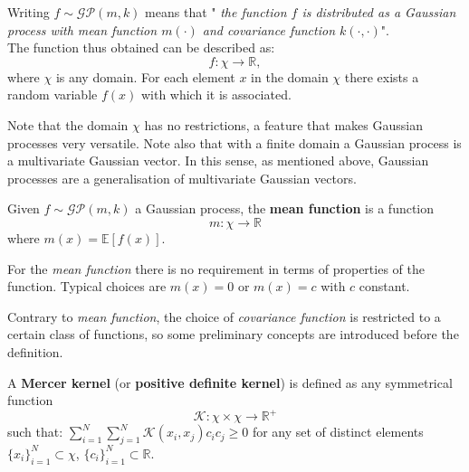 \begin{nota}
  Writing $f\sim \mathcal{GP}(m,k)$ means that "\textit{ the function $f$ is distributed as a Gaussian process with mean function $m(\cdot)$ and covariance function $k(\cdot,\cdot)$}".\\
  The function thus obtained can be described as:
\[f: \chi \rightarrow \mathbb{R},\]
where $\chi$ is any domain. For each element $x$ in the domain $\chi$ there exists a random variable $f(x)$ with which it is associated.
\end{nota}



\begin{oss} \label{oss1}
  Note that the domain $\chi$ has no restrictions, a feature that makes Gaussian processes very versatile. Note also that with a finite domain a Gaussian process is a multivariate Gaussian vector. In this sense, as mentioned above, Gaussian processes are a generalisation of multivariate Gaussian vectors. 
\end{oss}


\newpage
\begin{defi}
Given $f\sim \mathcal{GP}(m,k)$ a Gaussian process, the \textbf{mean function} is a function
\[
m:\chi \rightarrow \mathbb{R}
\]
where $m(x)=\mathbb{E}[f(x)]$.
\end{defi}

\begin{oss}
  For the \textit{mean function} there is no requirement in terms of properties of the function. Typical choices are $m(x)=0$ or $m(x)=c$ with $c$ constant.
\end{oss}

Contrary to \textit{mean function}, the choice of \textit{covariance function} is restricted to a certain class of functions, so some preliminary concepts are introduced before the definition.




\begin{defi}
  A \textbf{Mercer kernel} (or \textbf{positive definite kernel}) is defined as any symmetrical function 
\[
\mathcal{K}: \chi\times\chi \rightarrow \mathbb{R}^+
\]
 such that: $\sum_{i=1}^N\sum_{j=1}^N\mathcal{K}(x_i,x_j)c_ic_j \geq 0$ for any set of distinct elements $\{x_i\}_{i=1}^N\subset \chi$, $\{c_i\}_{i=1}^N\subset  \mathbb{R}$.
\end{defi}

